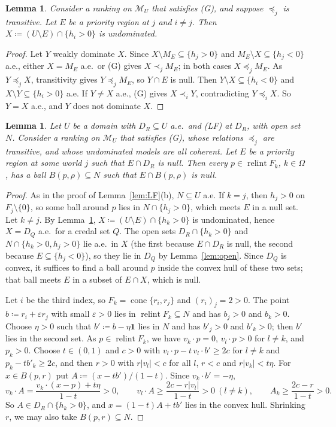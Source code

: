 \documentclass[11pt]{article}
\newcommand{\one}{\mathbf{1}}
\newcommand{\M}{\mathcal{M}}
\DeclareMathOperator{\cone}{cone}
\DeclareMathOperator{\relint}{relint}
\theoremstyle{plain}
\newtheorem{lemma}[theorem]{Lemma}
\theoremstyle{definition}
\theoremstyle{remark}
\begin{document}
\begin{lemma}\label{lem:boxlemma}
Consider a ranking on $\M_U$ that satisfies (G), and suppose $\preceq_j$ is transitive.
Let $E$ be a priority region at $j$ and $i\ne j$. Then $X\coloneqq(U\setminus E)\cap
\{h_i>0\}$ is undominated.
\end{lemma}

\begin{proof}
Let $Y$ weakly dominate $X$. Since $X\setminus M_E\subseteq\{h_j>0\}$ and $M_E\setminus
X\subseteq\{h_j<0\}$ a.e., either $X=M_E$ a.e.\ or (G) gives $X\prec_jM_E$; in both cases
$X\preceq_jM_E$. As $Y\preceq_jX$, transitivity gives $Y\preceq_jM_E$, so $Y\cap E$ is
null. Then $Y\setminus X\subseteq\{h_i<0\}$ and $X\setminus Y\subseteq\{h_i>0\}$ a.e. If
$Y\ne X$ a.e., (G) gives $X\prec_iY$, contradicting $Y\preceq_iX$. So $Y=X$ a.e., and $Y$
does not dominate $X$.
\end{proof}

\begin{lemma}\label{lem:collar}
Let $U$ be a domain with $D_R\subseteq U$ a.e.\ and (LF) at $D_R$, with open set $N$.
Consider a ranking on $\M_U$ that satisfies (G), whose relations $\preceq_j$ are
transitive, and whose undominated models are all coherent. Let $E$ be a priority region at
some world $j$ such that $E\cap D_R$ is null. Then every $p\in\relint F_k$, $k\in\Omega$,
has a ball $B(p,\rho)\subseteq N$ such that $E\cap B(p,\rho)$ is null.
\end{lemma}

\begin{proof}
As in the proof of Lemma~\ref{lem:LF}(b), $N\subseteq U$ a.e. If $k=j$, then $h_j>0$ on
$F_j\setminus\{0\}$, so some ball around $p$ lies in $N\cap\{h_j>0\}$, which meets $E$ in
a null set. Let $k\ne j$. By Lemma~\ref{lem:boxlemma}, $X\coloneqq(U\setminus E)\cap
\{h_k>0\}$ is undominated, hence $X=D_Q$ a.e.\ for a credal set $Q$. The open sets
$D_R\cap\{h_k>0\}$ and $N\cap\{h_k>0,h_j>0\}$ lie a.e.\ in $X$ (the first because
$E\cap D_R$ is null, the second because $E\subseteq\{h_j<0\}$), so they lie in $D_Q$ by
Lemma~\ref{lem:open}. Since $D_Q$ is convex, it suffices to find a ball around $p$ inside
the convex hull of these two sets; that ball meets $E$ in a subset of $E\cap X$, which is
null.

Let $i$ be the third index, so $F_k=\cone\{r_i,r_j\}$ and $(r_i)_j=2>0$. The point
$b\coloneqq r_i+\varepsilon r_j$ with small $\varepsilon>0$ lies in $\relint F_k\subseteq
N$ and has $b_j>0$ and $b_k>0$. Choose $\eta>0$ such that $b'\coloneqq b-\eta\one$ lies in
$N$ and has $b'_j>0$ and $b'_k>0$; then $b'$ lies in the second set. As $p\in\relint F_k$, we
have $v_k\cdot p=0$, $v_l\cdot p>0$ for $l\ne k$, and $p_k>0$. Choose $t\in(0,1)$ and
$c>0$ with $v_l\cdot p-t\,v_l\cdot b'\ge2c$ for $l\ne k$ and $p_k-tb'_k\ge2c$, and then
$r>0$ with $r|v_l|<c$ for all $l$, $r<c$ and $r|v_k|<t\eta$. For $x\in B(p,r)$ put
$A\coloneqq(x-tb')/(1-t)$. Since $v_k\cdot b'=-\eta$,
\[
  v_k\cdot A=\frac{v_k\cdot(x-p)+t\eta}{1-t}>0,\qquad
  v_l\cdot A\ge\frac{2c-r|v_l|}{1-t}>0\ (l\ne k),\qquad
  A_k\ge\frac{2c-r}{1-t}>0 .
\]
So $A\in D_R\cap\{h_k>0\}$, and $x=(1-t)A+tb'$ lies in the convex hull. Shrinking $r$, we
may also take $B(p,r)\subseteq N$.
\end{proof}
\end{document}
